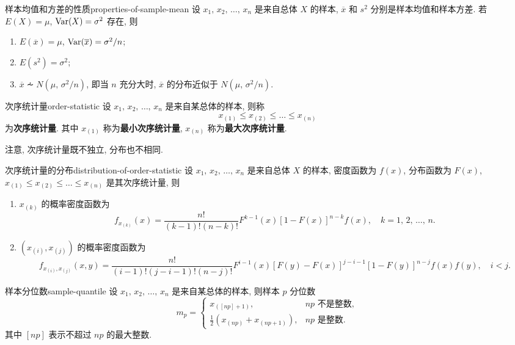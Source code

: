 \begin{newtheorembox}{样本均值和方差的性质}{properties-of-sample-mean}
	设 $x_1,\,x_2,\,\dots,\,x_n$ 是来自总体 $X$ 的样本, $\overline{x}$ 和 $s^2$ 分别是样本均值和样本方差.  若 $E(X)=\mu$, $\mathop{\mathrm{Var}}\nolimits(X)=\sigma^2$ 存在, 则
	\begin{enumerate}
		\item $E(\overline{x})=\mu$, $\mathop{\mathrm{Var}}\nolimits(\overline{x})=\sigma^2/n$;
		\item $E(s^2)=\sigma^2$;
		\item $\overline{x}\dotsim N(\mu,\,\sigma^2/n)$, 即当 $n$ 充分大时, $\overline{x}$ 的分布近似于 $N(\mu,\,\sigma^2/n)$.
	\end{enumerate}
\end{newtheorembox}

\begin{newdefbox}{次序统计量}{order-statistic}
	设 $x_1,\,x_2,\,\dots,\,x_n$ 是来自某总体的样本, 则称
	\[
		x_{(1)}\leqslant x_{(2)}\leqslant\dots\leqslant x_{(n)}
	\]
	为\textbf{次序统计量}.  其中 $x_{(1)}$ 称为\textbf{最小次序统计量}, $x_{(n)}$ 称为\textbf{最大次序统计量}.\par
	注意, 次序统计量既不独立, 分布也不相同.
\end{newdefbox}

\begin{newtheorembox}{次序统计量的分布}{distribution-of-order-statistic}
	设 $x_1,\,x_2,\,\dots,\,x_n$ 是来自总体 $X$ 的样本, 密度函数为 $f(x)$, 分布函数为 $F(x)$, $x_{(1)}\leqslant x_{(2)}\leqslant\dots\leqslant x_{(n)}$ 是其次序统计量, 则
	\begin{enumerate}
		\item $x_{(k)}$ 的概率密度函数为
			\[
				f_{x_{(k)}}(x)=\frac{n!}{(k-1)!(n-k)!}F^{k-1}(x)[1-F(x)]^{n-k}f(x),\quad k=1,\,2,\,\dots,\,n.
			\]
		\item $(x_{(i)},x_{(j)})$ 的概率密度函数为
			\[
				f_{x_{(i)},x_{(j)}}(x,y)=\frac{n!}{(i-1)!(j-i-1)!(n-j)!}F^{i-1}(x)[F(y)-F(x)]^{j-i-1}[1-F(y)]^{n-j}f(x)f(y),\quad i<j.
			\]
	\end{enumerate}
\end{newtheorembox}

\begin{newdefbox}{样本分位数}{sample-quantile}
	设 $x_1,\,x_2,\,\dots,\,x_n$ 是来自某总体的样本, 则样本 $p$ 分位数
	\[
		m_p=\begin{cases}
			x_{([np]+1)}, & np\text{ 不是整数},\\
			\frac{1}{2}(x_{(np)}+x_{(np+1)}), & np\text{ 是整数}.
		\end{cases}
	\]
	其中 $[np]$ 表示不超过 $np$ 的最大整数.
\end{newdefbox}

